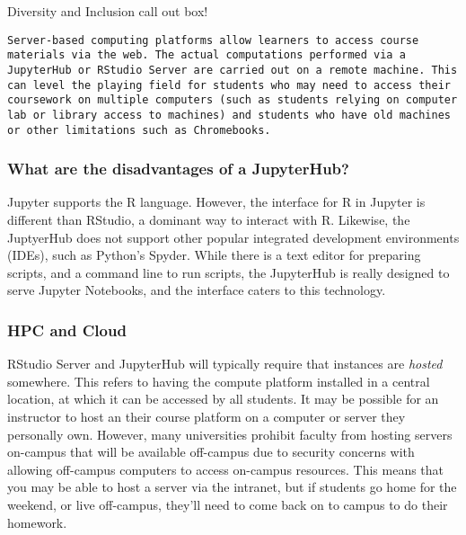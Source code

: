 {\begin{framed}
Diversity and Inclusion call out box! 
\begin{snugshade*}
\begin{lstlisting}
Server-based computing platforms allow learners to access course materials via the web. The actual computations performed via a JupyterHub or RStudio Server are carried out on a remote machine. This can level the playing field for students who may need to access their coursework on multiple computers (such as students relying on computer lab or library access to machines) and students who have old machines or other limitations such as Chromebooks.
\end{lstlisting}
\end{snugshade*}
\end{framed}}

\subsubsection{What are the disadvantages of a JupyterHub?}

Jupyter supports the R language.
However, the interface for R in Jupyter is different than RStudio, a dominant way to interact with R.
Likewise, the JuptyerHub does not support other popular integrated development environments (IDEs), such as Python's Spyder.
While there is a text editor for preparing scripts, and a command line to run scripts, the JupyterHub is really designed to serve Jupyter Notebooks, and the interface caters to this technology.



\subsubsection{HPC and Cloud}\label{HPC}

RStudio Server and JupyterHub will typically require that instances are \textit{hosted} somewhere.
This refers to having the compute platform installed in a central location, at which it can be accessed by all students.
It may be possible for an instructor to host an their course platform on a computer or server they personally own.
However, many universities prohibit faculty from hosting servers on-campus that will be available off-campus due to security concerns with allowing off-campus computers to access on-campus resources.
This means that you may be able to host a server via the intranet, but if students go home for the weekend, or live off-campus, they'll need to come back on to campus to do their homework.

